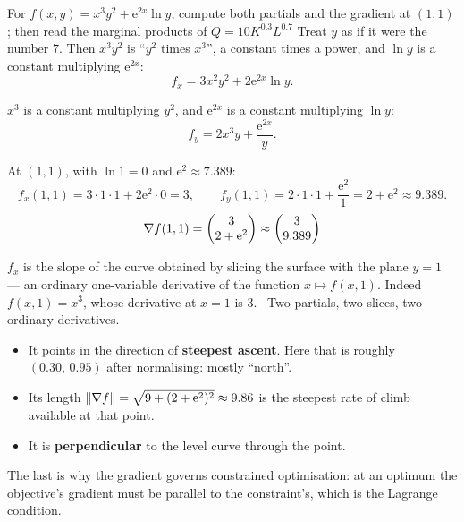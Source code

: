 \begin{worked}{For $f(x,y)=x^{3}y^{2}+\mathrm{e}^{2x}\ln y$, compute both partials and the gradient at $(1,1)$; then read the marginal products of $Q=10K^{0.3}L^{0.7}$}
Treat $y$ as if it were the number $7$. Then $x^{3}y^{2}$ is
``$y^{2}$ times $x^{3}$'', a constant times a power, and $\ln y$ is a
constant multiplying $\mathrm{e}^{2x}$:
\[
  f_{x}=3x^{2}y^{2}+2\mathrm{e}^{2x}\ln y .
\]

$x^{3}$ is a constant multiplying $y^{2}$, and $\mathrm{e}^{2x}$ is a
constant multiplying $\ln y$:
\[
  f_{y}=2x^{3}y+\frac{\mathrm{e}^{2x}}{y} .
\]

At $(1,1)$, with $\ln1=0$ and $\mathrm{e}^{2}\approx7.389$:
\[
  f_{x}(1,1)=3\cdot1\cdot1+2\mathrm{e}^{2}\cdot0=3,
  \qquad
  f_{y}(1,1)=2\cdot1\cdot1+\frac{\mathrm{e}^{2}}{1}=2+\mathrm{e}^{2}\approx9.389 .
\]
\[
  \nabla f(1,1)=\begin{pmatrix}3\\2+\mathrm{e}^{2}\end{pmatrix}\approx\begin{pmatrix}3\\9.389\end{pmatrix}
\]

$f_{x}$ is the slope of the curve obtained by slicing the surface with the
plane $y=1$ --- an ordinary one-variable derivative of the function
$x\mapsto f(x,1)$. Indeed $f(x,1)=x^{3}$, whose derivative at $x=1$ is $3$.
\checkmark\ Two partials, two slices, two ordinary derivatives.

\begin{itemize}[leftmargin=1.6em,itemsep=0.2ex]
  \item It points in the direction of \textbf{steepest ascent}. Here that
        is roughly $(0.30,\,0.95)$ after normalising: mostly ``north''.
  \item Its length $\|\nabla f\|=\sqrt{9+(2+\mathrm{e}^{2})^{2}}\approx9.86$
        is the steepest rate of climb available at that point.
  \item It is \textbf{perpendicular} to the level curve through the point.
\end{itemize}
The last is why the gradient governs constrained optimisation: at an
optimum the objective's gradient must be parallel to the constraint's, which
is the Lagrange condition.


\end{worked}
